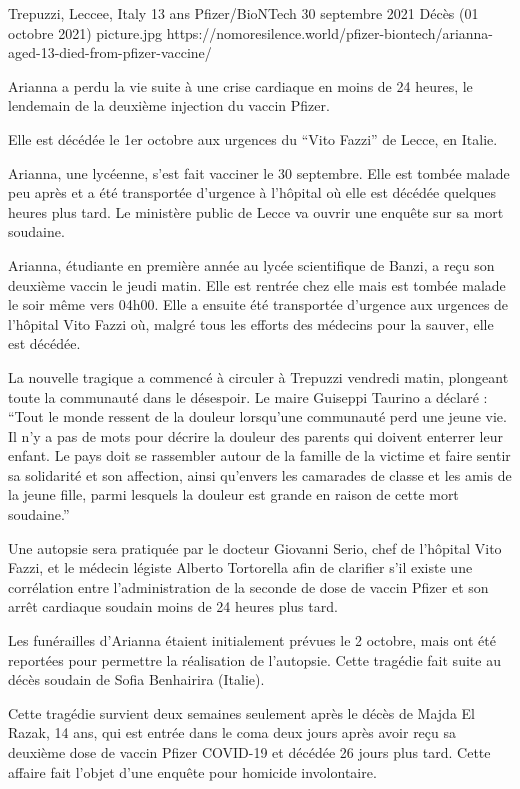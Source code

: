 {Trepuzzi, Leccee, Italy}
{13 ans}
{Pfizer/BioNTech}
{30 septembre 2021}
{Décès (01 octobre 2021)}
{picture.jpg}
{https://nomoresilence.world/pfizer-biontech/arianna-aged-13-died-from-pfizer-vaccine/}
{

Arianna a perdu la vie suite à une crise cardiaque en moins de 24 heures, le
lendemain de la deuxième injection du vaccin Pfizer.

Elle est décédée le 1er octobre aux urgences du “Vito Fazzi” de Lecce, en
Italie.

Arianna, une lycéenne, s'est fait vacciner le 30 septembre. Elle est tombée
malade peu après et a été transportée d'urgence à l'hôpital où elle est décédée
quelques heures plus tard. Le ministère public de Lecce va ouvrir une enquête
sur sa mort soudaine.

Arianna, étudiante en première année au lycée scientifique de Banzi, a reçu son
deuxième vaccin le jeudi matin. Elle est rentrée chez elle mais est tombée
malade le soir même vers 04h00. Elle a ensuite été transportée d'urgence aux
urgences de l'hôpital Vito Fazzi où, malgré tous les efforts des médecins pour
la sauver, elle est décédée.

La nouvelle tragique a commencé à circuler à Trepuzzi vendredi matin, plongeant
toute la communauté dans le désespoir. Le maire Guiseppi Taurino a déclaré :
“Tout le monde ressent de la douleur lorsqu'une communauté perd une jeune
vie. Il n'y a pas de mots pour décrire la douleur des parents qui doivent
enterrer leur enfant. Le pays doit se rassembler autour de la famille de la
victime et faire sentir sa solidarité et son affection, ainsi qu'envers les
camarades de classe et les amis de la jeune fille, parmi lesquels la douleur est
grande en raison de cette mort soudaine.”

Une autopsie sera pratiquée par le docteur Giovanni Serio, chef de l'hôpital
Vito Fazzi, et le médecin légiste Alberto Tortorella afin de clarifier s'il
existe une corrélation entre l'administration de la seconde de dose de vaccin
Pfizer et son arrêt cardiaque soudain moins de 24 heures plus tard.

Les funérailles d'Arianna étaient initialement prévues le 2 octobre, mais ont
été reportées pour permettre la réalisation de l'autopsie. Cette tragédie fait
suite au décès soudain de Sofia Benhairira (Italie).

Cette tragédie survient deux semaines seulement après le décès de Majda El
Razak, 14 ans, qui est entrée dans le coma deux jours après avoir reçu sa
deuxième dose de vaccin Pfizer COVID-19 et décédée 26 jours plus tard. Cette
affaire fait l'objet d'une enquête pour homicide involontaire.

}
